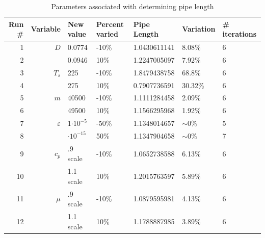 \documentclass[titlepage,11pt]{article}
\begin{document}
\begin{table}[h]
\begin{center}
\caption{Parameters associated with determining pipe length}
\begin{tabular}{|r|r|l|l|l|l|l|}
\hline
{\bf Run \#} & {\bf Variable} & {\bf New value} & {\bf Percent varied} & {\bf Pipe Length} & {\bf Variation} & {\bf \# iterations} \\
\hline
         1 &        $D$ &     0.0774 &       -10\% &1.0430611141     &8.08\%&          6\\

         2 &            &     0.0946 &        10\% &1.2247005097     &7.92\%&          6 \\
\hline
         3 &      $T_s$ &        225 &       -10\% &1.8479438758     &68.8\%&          6  \\

         4 &            &        275 &        10\% &0.7907736591     &30.32\%&         6   \\
\hline
         5 &        $m$ &      40500 &       -10\% &1.1111284458      &2.09\%&         6   \\

         6 &            &      49500 &        10\% &1.1566295968      &1.92\%&         6  \\
\hline
         7 & $\varepsilon$ &1$\cdot10^{-5}$&       -50\% &1.1348014657 &$\sim$0\%&     5      \\

         8 &            &$\cdot10^{-15}$ &        50\% &1.1347904658   &$\sim$0\%&     7    \\
\hline
         9 &      $c_p$ &  .9 scale  &       -10\% &1.0652738588      &6.13\%&         6   \\

        10 &            & 1.1 scale  &        10\% &1.2015763597      &5.89\%&         6   \\
\hline
        11 &      $\mu$ &  .9 scale  &       -10\% &1.0879595981      &4.13\%&         6   \\

        12 &            & 1.1 scale  &        10\% &1.1788887985      &3.89\%&         6   \\
\hline
\end{tabular}
\end{center}
\end{table}
\end{document}
